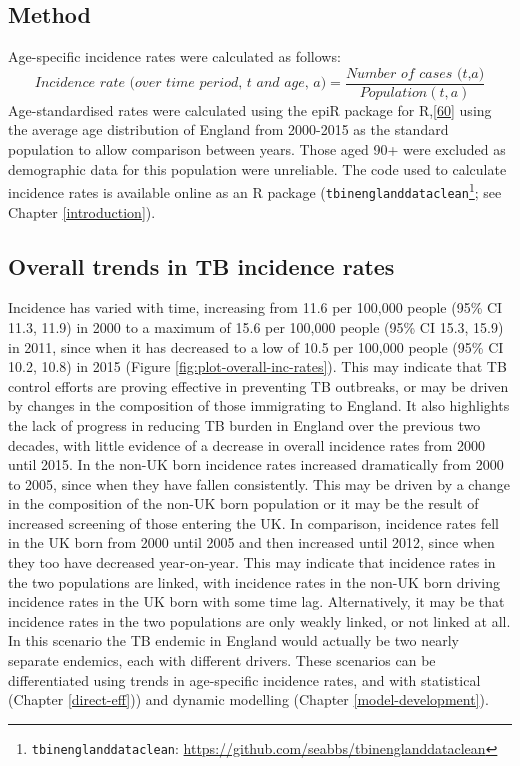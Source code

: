 \documentclass[11pt,twoside]{bristolthesis}
\begin{document}
  \hypertarget{method-1}{%
  \subsection{Method}\label{method-1}}
  
  Age-specific incidence rates were calculated as follows:
  \begin{equation} 
    \textit{Incidence rate (over time period, t and age, a)} = \frac{\textit{Number of cases (t,a)}}{Population(t, a)}
    \label{eq:incEq}
  \end{equation}
  Age-standardised rates were calculated using the epiR package for R,{[}\protect\hyperlink{ref-EpiR}{60}{]} using the average age distribution of England from 2000-2015 as the standard population to allow comparison between years. Those aged 90+ were excluded as demographic data for this population were unreliable. The code used to calculate incidence rates is available online as an R package (\texttt{tbinenglanddataclean}\footnote{\texttt{tbinenglanddataclean}: \url{https://github.com/seabbs/tbinenglanddataclean}}; see Chapter \ref{introduction}).
  
  \hypertarget{overall-trends-in-tb-incidence-rates}{%
  \subsection{Overall trends in TB incidence rates}\label{overall-trends-in-tb-incidence-rates}}
  
  Incidence has varied with time, increasing from 11.6 per 100,000 people (95\% CI 11.3, 11.9) in 2000 to a maximum of 15.6 per 100,000 people (95\% CI 15.3, 15.9) in 2011, since when it has decreased to a low of 10.5 per 100,000 people (95\% CI 10.2, 10.8) in 2015 (Figure \ref{fig:plot-overall-inc-rates}). This may indicate that TB control efforts are proving effective in preventing TB outbreaks, or may be driven by changes in the composition of those immigrating to England. It also highlights the lack of progress in reducing TB burden in England over the previous two decades, with little evidence of a decrease in overall incidence rates from 2000 until 2015. In the non-UK born incidence rates increased dramatically from 2000 to 2005, since when they have fallen consistently. This may be driven by a change in the composition of the non-UK born population or it may be the result of increased screening of those entering the UK. In comparison, incidence rates fell in the UK born from 2000 until 2005 and then increased until 2012, since when they too have decreased year-on-year. This may indicate that incidence rates in the two populations are linked, with incidence rates in the non-UK born driving incidence rates in the UK born with some time lag. Alternatively, it may be that incidence rates in the two populations are only weakly linked, or not linked at all. In this scenario the TB endemic in England would actually be two nearly separate endemics, each with different drivers. These scenarios can be differentiated using trends in age-specific incidence rates, and with statistical (Chapter \ref{direct-eff})) and dynamic modelling (Chapter \ref{model-development}).
  
\end{document}
